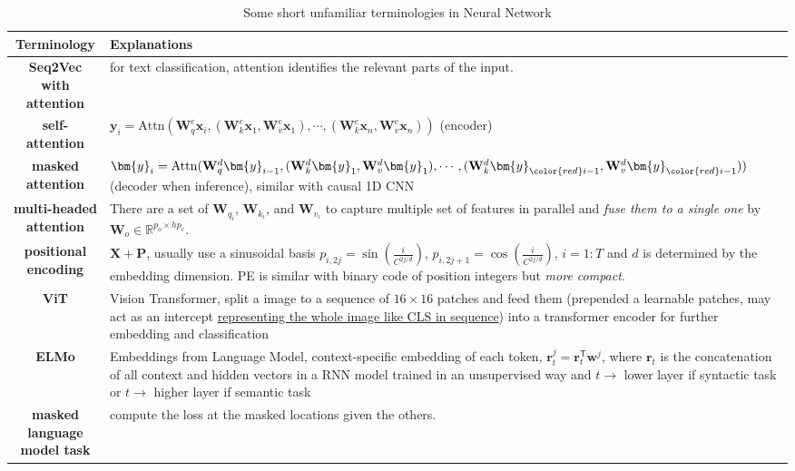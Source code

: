 \begin{table}[htpb]
    \centering
    \caption{Some short unfamiliar terminologies in Neural Network}
    {\footnotesize

}
    {\small
    \begin{tabular}{cp{32em}}
        \toprule
        Terminology & Explanations \\
        \midrule
        \textbf{Seq2Vec with attention} & for text classification, attention identifies the relevant parts of the input. \\
        \textbf{self-attention} & $\bm{y}_i=\mathrm{Attn}(\mathbf{W}_q^e\bm{x}_i,(\mathbf{W}_k^e\bm{x}_1,\mathbf{W}_v^e\bm{x}_1),\cdots,(\mathbf{W}_k^e\bm{x}_n,\mathbf{W}_v^e\bm{x}_n))$ (encoder) \\
        \textbf{masked attention} & $\bm{y}_i=\mathrm{Attn}(\mathbf{W}_q^d\bm{y}_{i-1},(\mathbf{W}_k^d\bm{y}_1,\mathbf{W}_v^d\bm{y}_1),\cdots,(\mathbf{W}_k^d\bm{y}_{\color{red}i-1},\mathbf{W}_v^d\bm{y}_{\color{red}i-1}))$ (decoder when inference), similar with causal 1D CNN \\
        \textbf{multi-headed attention} & There are a set of $\mathbf{W}_{q_i}$, $\mathbf{W}_{k_i}$, and $\mathbf{W}_{v_i}$ to capture multiple set of features in parallel and \textit{fuse them to a single one} by $\mathbf{W}_o\in\mathbb{R}^{p_o\times hp_v}$.\\
        \textbf{positional encoding} & $\mathbf{X}+\mathbf{P}$, usually use a sinusoidal basis $p_{i,2j}=\sin\left(\frac{i}{C^{2j/d}}\right)$, $p_{i,2j+1}=\cos\left(\frac{i}{C^{2j/d}}\right)$, $i=1:T$ and $d$ is determined by the embedding dimension. PE is similar with binary code of position integers but \textit{more compact}.\\
        \textbf{ViT} & Vision Transformer, split a image to a sequence of $16\times 16$ patches and feed them (prepended a learnable patches, may act as an intercept \uline{representing the whole image like CLS in sequence}) into a transformer encoder for further embedding and classification\\
        \textbf{ELMo} & Embeddings from Language Model, context-specific embedding of each token, $\bm{r}_t^j=\bm{r}_t^\mathsf{T}\bm{w}^j$, 
        where $\bm{r}_t$ is the concatenation of all context and hidden vectors in a RNN model trained in an unsupervised way 
        and $t\to $ lower layer if syntactic task or $t\to$ higher layer if  semantic task \\
        \textbf{masked language model task} &  compute the loss at the masked locations given the others. \\

\end{tabular}}
\end{table}
